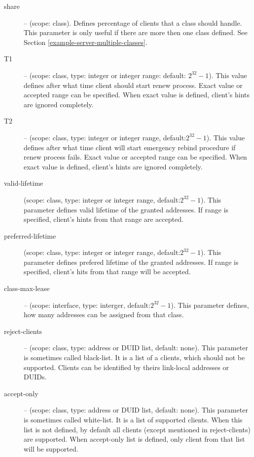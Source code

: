 \begin{description}
\item[share] -- (scope: class). Defines percentage of clients that a
  class should handle. This parameter is only useful if there are more
  then one class defined. See Section
  \ref{example-server-multiple-classes}.

 \item[T1] -- (scope: class, type: integer or integer range: default:
   $2^{32}-1$). This value defines after what time client should start
   renew process. Exact value or accepted range can be specified. When
   exact value is defined, client's hints are ignored completely.

 \item[T2] -- (scope: class, type: integer or integer range,
   default:$2^{32}-1$). This value defines after what time client will
   start emergency rebind procedure if renew process fails. Exact
   value or accepted range can be specified. When exact value is
   defined, client's hints are ignored completely.

\item[valid-lifetime] (scope: class, type: integer or integer range,
            default:$2^{32}-1$). This parameter defines valid lifetime of
            the granted addresses. If range is specified, client's
            hints from that range are accepted.

\item[preferred-lifetime] (scope: class, type: integer or integer range,
            default:$2^{32}-1$). This parameter defines prefered
            lifetime of the granted addresses. If range is specified,
            client's hits from that range will be accepted.

\item[class-max-lease]  -- (scope: interface, type: interger,
            default:$2^{32}-1$). This parameter defines, how many
            addresses can be assigned from that class.

\item[reject-clients] -- (scope: class, type: address or DUID list,
            default: none). This parameter is sometimes called
            black-list. It is a list of a clients, which should not be
            supported. Clients can be identified by theirs link-local
            addresses or DUIDs.

\item[accept-only] -- (scope: class, type: address or DUID list,
            default: none). This parameter is sometimes called
            white-list. It is a list of supported clients. When this
            list is not defined, by default all clients (except
            mentioned in reject-clients) are supported. When
            accept-only list is defined, only client from that list
            will be supported.


\end{description}
